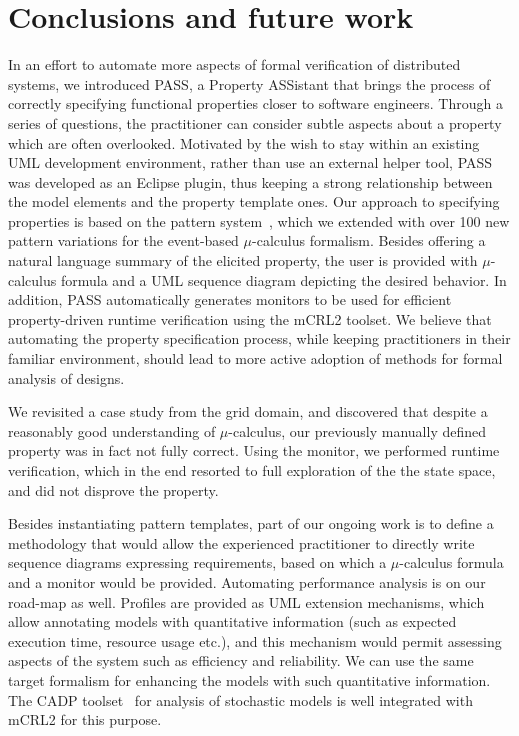 \documentclass[letter]{llncs}
\begin{document}
\section{Conclusions and future work}
\label{sec:Conclusions}
\vspace{-8 pt}
In an effort to automate more aspects of formal verification of distributed
systems, we introduced PASS, a Property ASSistant that brings the process of
correctly specifying 
functional properties closer to software engineers.
Through a series of questions, the practitioner can
consider subtle aspects about a property which are often overlooked.
Motivated by the wish to stay within an existing UML development environment,
rather than use an external helper tool, PASS was developed as an Eclipse plugin,
thus keeping a strong relationship between the model elements and the property template ones.
Our approach to specifying properties is based on the pattern system~\cite{Dwyer:1999:PPS:302405.302672},
which we extended with over 100 new pattern variations for the event-based $\mu$-calculus
formalism. Besides offering a natural language summary of the elicited property,
the user is provided with $\mu$-calculus formula and a UML sequence
diagram depicting the desired behavior. In addition, PASS
automatically generates monitors to be used for efficient property-driven 
runtime verification using the mCRL2 toolset. We believe that automating the property specification process, while keeping
practitioners in their familiar environment, should lead to more active adoption of methods for formal analysis of designs.

We revisited a case study from the grid domain, and discovered that 
despite a reasonably good understanding of $\mu$-calculus, our previously manually
defined property was in fact not fully correct. Using the monitor, we performed runtime verification, which in
the end resorted to full exploration of the the state space, and did not disprove the property.

Besides instantiating pattern templates, part of our ongoing work is to define 
a methodology that would allow the experienced practitioner to directly 
write sequence diagrams expressing requirements, based on which a $\mu$-calculus formula and a monitor 
would be provided. Automating performance analysis is on our road-map as well. 
Profiles are provided as UML extension mechanisms, which allow 
annotating models with quantitative information (such as expected execution time, resource usage etc.),
and this mechanism would permit assessing aspects of the system
such as efficiency and reliability.
We can use the same target formalism for enhancing the models
with such quantitative information. The CADP toolset~\cite{DBLP:conf/tacas/GaravelLMS11} for analysis of stochastic
models is well integrated with mCRL2 for this purpose.
\vspace{-10 pt}
 
\vspace{-3 pt}

\end{document}
